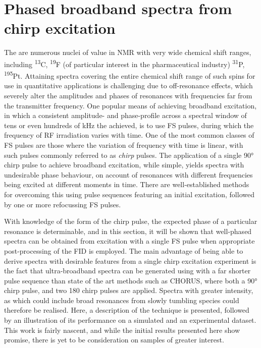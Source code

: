 \section{Phased broadband spectra from chirp excitation}
\label{sec:bbqchili}

The are numerous nuclei of value in \ac{NMR} with very wide chemical shift
ranges, including \textsuperscript{13}C, \textsuperscript{19}F (of
particular interest in the pharmaceutical industry) \textsuperscript{31}P,
\textsuperscript{195}Pt.
Attaining spectra covering the entire chemical shift range of such spins for
use in quantitative applications is challenging due to off-resonance effects,
which severely alter the amplitudes and phases of resonances with frequencies
far from the transmitter frequency\cite[Section 3.4.1]{Cavanagh2007}. One
popular means of achieving broadband excitation, in which a consistent
amplitude- and phase-profile across a spectral window of tens or even hundreds
of \unit{\kilo\hertz} the achieved, is to use \ac{FS} pulses, during
which the frequency of \ac{RF} irradiation varies with
time\cite{Foroozandeh2020}. One of the most common classes of \ac{FS} pulses
are those where the variation of frequency with time is linear, with such
pulses commonly referred to as \emph{chirp} pulses. The application of a single
\ang{90} chirp pulse to achieve broadband excitation, while simple, yields
spectra with undesirable phase behaviour, on account of resonances with
different frequencies being excited at different moments in time.
There are well-established methods for overcoming this using
pulse sequences featuring an initial excitation, followed by one or more
refocussing \ac{FS}
pulses\cite{Bohlen1989,Bohlen1993,Cano2002,Power2016,Foroozandeh2019}.

With knowledge of the form of the chirp pulse, the expected phase of a
particular resonance is determinable, and in this section, it will be shown
that well-phased spectra can be obtained from excitation with a single \ac{FS}
pulse when appropriate post-processing of the \ac{FID} is employed.
The main advantage of being able to derive spectra with desirable features from
a single chirp excitation experiment is the fact that ultra-broadband spectra
can be generated using with a far shorter pulse sequence than state of the art
methods such as \ac{CHORUS}\cite{Power2016,Foroozandeh2019}, where both a
\ang{90} chirp pulse, and two \ac{180} chirp pulses are applied. Spectra with
greater intensity, as which could include broad resonances from slowly tumbling
species could therefore be realised.  Here, a description of the technique is
presented, followed by an illustration of its performance on a simulated and an
experimental dataset. This work is fairly nascent, and while the initial
results presented here show promise, there is yet to be consideration on
samples of greater interest.

